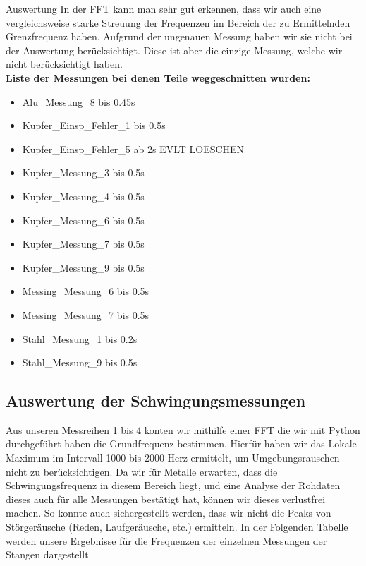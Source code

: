 \documentclass[twoside]{protokoll}
\begin{document}
\begin{aufgabe}{Auswertung}
In der FFT kann man sehr gut erkennen, dass wir auch eine vergleichsweise starke Streuung der Frequenzen im Bereich der zu Ermittelnden Grenzfrequenz haben.
Aufgrund der ungenauen Messung haben wir sie nicht bei der Auswertung berücksichtigt.
Diese ist aber die einzige Messung, welche wir nicht berücksichtigt haben. \\
 

\textbf{Liste der Messungen bei denen Teile weggeschnitten wurden:}
\begin{itemize}
\item Alu\_Messung\_8 bis 0.45s
\item Kupfer\_Einsp\_Fehler\_1 bis 0.5s
\item Kupfer\_Einsp\_Fehler\_5 ab 2s EVLT LOESCHEN
\item Kupfer\_Messung\_3 bis 0.5s
\item Kupfer\_Messung\_4 bis 0.5s
\item Kupfer\_Messung\_6 bis 0.5s
\item Kupfer\_Messung\_7 bis 0.5s
\item Kupfer\_Messung\_9 bis 0.5s
\item Messing\_Messung\_6 bis 0.5s
\item Messing\_Messung\_7 bis 0.5s
\item Stahl\_Messung\_1 bis 0.2s
\item Stahl\_Messung\_9 bis 0.5s
\end{itemize}

 
\subsection{Auswertung der Schwingungsmessungen}
Aus unseren Messreihen 1 bis 4 konten wir mithilfe einer FFT die wir mit Python durchgeführt haben die Grundfrequenz bestimmen.
Hierfür haben wir das Lokale Maximum im Intervall 1000 bis 2000 Herz ermittelt, um Umgebungsrauschen nicht zu berücksichtigen.
Da wir für Metalle erwarten, dass die Schwingungsfrequenz in diesem Bereich liegt, und eine Analyse der Rohdaten dieses auch für alle Messungen bestätigt hat, können wir dieses verlustfrei machen.
So konnte auch sichergestellt werden, dass wir nicht die Peaks von Störgeräusche (Reden, Laufgeräusche, etc.) ermitteln.
In der Folgenden Tabelle werden unsere Ergebnisse für die Frequenzen der einzelnen Messungen der Stangen dargestellt.



\end{aufgabe}
\end{document}
